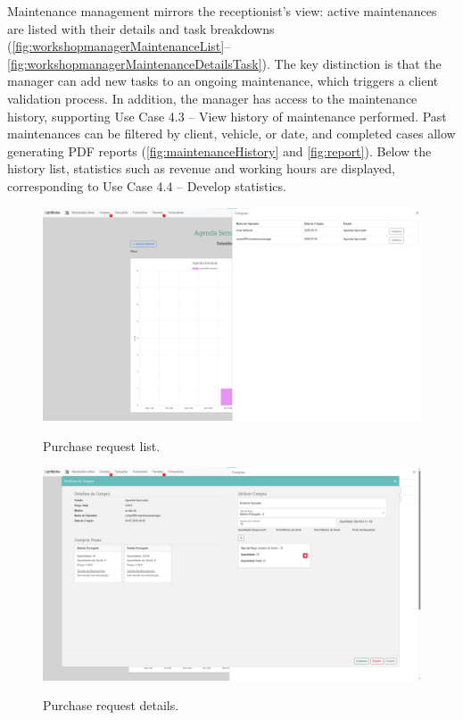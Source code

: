 Maintenance management mirrors the receptionist's view: active maintenances are listed with their details and task breakdowns (\ref{fig:workshopmanagerMaintenanceList}–\ref{fig:workshopmanagerMaintenanceDetailsTask}). The key distinction is that the manager can add new tasks to an ongoing maintenance, which triggers a client validation process. In addition, the manager has access to the maintenance history, supporting Use Case 4.3 – View history of maintenance performed. Past maintenances can be filtered by client, vehicle, or date, and completed cases allow generating PDF reports (\ref{fig:maintenanceHistory} and \ref{fig:report}). Below the history list, statistics such as revenue and working hours are displayed, corresponding to Use Case 4.4 – Develop statistics.

\begin{figure}[h]
  \caption{Purchase request list.}
  \centering
  \includegraphics[width=\textwidth]{figs/Implementation/workshopmanager/purchaseList}
  \label{fig:workshopmanagerPurchaseList}
\end{figure}



\begin{figure}[h]
  \caption{Purchase request details.}
  \centering
  \includegraphics[width=\textwidth]{figs/Implementation/workshopmanager/purchaseDetails}
  \label{fig:workshopmanagerPurchaseDetails}
\end{figure}

